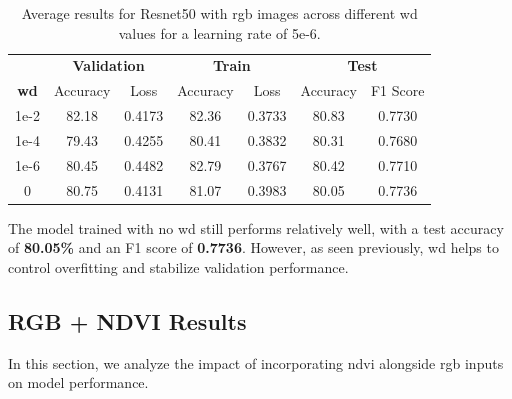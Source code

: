 \begin{table}[h]
    \centering
    \renewcommand{\arraystretch}{1.3}
    \setlength{\tabcolsep}{8pt}
    \begin{tabular}{|c|cccccc|}
        \hline
        & \multicolumn{2}{c}{\textbf{Validation}} & \multicolumn{2}{c}{\textbf{Train}} & \multicolumn{2}{c|}{\textbf{Test}} \\
        \textbf{\gls{wd}} & Accuracy & Loss & Accuracy & Loss & Accuracy & F1 Score \\
        \hline
        1e-2 & 82.18 & 0.4173 & 82.36 & 0.3733 & 80.83 & 0.7730 \\
        1e-4 & 79.43 & 0.4255 & 80.41 & 0.3832 & 80.31 & 0.7680 \\
        1e-6 & 80.45 & 0.4482 & 82.79 & 0.3767 & 80.42 & 0.7710 \\
        0    & 80.75 & 0.4131 & 81.07 & 0.3983 & 80.05 & 0.7736 \\
        \hline
    \end{tabular}
    \caption{Average results for Resnet50 with \gls{rgb} images across different \gls{wd} values for a learning rate of 5e-6.}
    \label{tab:resnet50_wd_rgb}
\end{table}


The model trained with no \gls{wd} still performs relatively 
well, with a test accuracy of \textbf{80.05\%} and an F1 score of \textbf{0.7736}. However, as seen 
previously, \gls{wd} helps to control overfitting and stabilize validation performance. 



\subsection{RGB + NDVI Results}

In this section, we analyze the impact of incorporating \gls{ndvi} alongside \gls{rgb} inputs 
on model performance.

